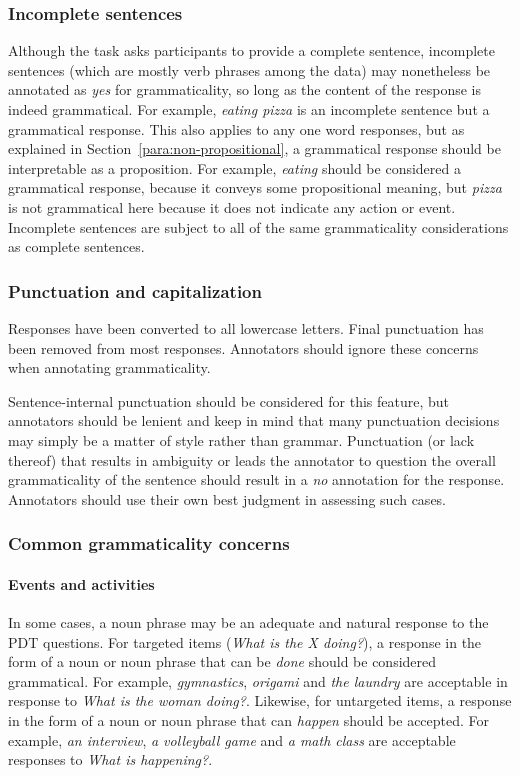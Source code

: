 \documentclass[12pt]{article}
\begin{document}
\subsubsection{Incomplete sentences} \label{subsubsec:gram-incomplete-sentences} Although the task asks participants to provide a complete sentence, incomplete sentences (which are mostly verb phrases among the data) may nonetheless be annotated as \textit{yes} for grammaticality, so long as the content of the response is indeed grammatical. For example, \textit{eating pizza} is an incomplete sentence but a grammatical response. This also applies to any one word responses, but as explained in Section~\ref{para:non-propositional}, a grammatical response should be interpretable as a proposition. For example, \textit{eating} should be considered a grammatical response, because it conveys some propositional meaning, but \textit{pizza} is not grammatical here because it does not indicate any action or event. Incomplete sentences are subject to all of the same grammaticality considerations as complete sentences.

\subsubsection{Punctuation and capitalization} Responses have been converted to all lowercase letters. Final punctuation has been removed from most responses. Annotators should ignore these concerns when annotating grammaticality. 

Sentence-internal punctuation should be considered for this feature, but annotators should be lenient and keep in mind that many punctuation decisions may simply be a matter of style rather than grammar. Punctuation (or lack thereof) that results in ambiguity or leads the annotator to question the overall grammaticality of the sentence should result in a \textit{no} annotation for the response. Annotators should use their own best judgment in assessing such cases.

\subsubsection{Common grammaticality concerns}

\paragraph{Events and activities}
\label{para:gram-events} In some cases, a noun phrase may be an adequate and natural response to the PDT questions. For targeted items (\textit{What is the X doing?}), a response in the form of a noun or noun phrase that can be \textit{done} should be considered grammatical. For example, \textit{gymnastics}, \textit{origami} and \textit{the laundry} are acceptable in response to \textit{What is the woman doing?}. Likewise, for untargeted items, a response in the form of a noun or noun phrase that can \textit{happen} should be accepted. For example, \textit{an interview}, \textit{a volleyball game} and \textit{a math class} are acceptable responses to \textit{What is happening?}.
\end{document}
